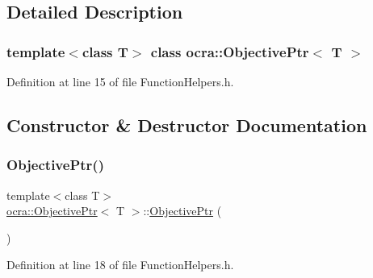 \subsection{Detailed Description}
\subsubsection*{template$<$class T$>$\newline
class ocra\+::\+Objective\+Ptr$<$ T $>$}



Definition at line 15 of file Function\+Helpers.\+h.



\subsection{Constructor \& Destructor Documentation}
\hypertarget{classocra_1_1ObjectivePtr_ac82097858040b94f9beb50e038dd00d6}{}\label{classocra_1_1ObjectivePtr_ac82097858040b94f9beb50e038dd00d6} 
\subsubsection{\texorpdfstring{Objective\+Ptr()}{ObjectivePtr()}\hspace{0.1cm}{\footnotesize\ttfamily [1/2]}}
{\footnotesize\ttfamily template$<$class T$>$ \\
\hyperlink{classocra_1_1ObjectivePtr}{ocra\+::\+Objective\+Ptr}$<$ T $>$\+::\hyperlink{classocra_1_1ObjectivePtr}{Objective\+Ptr} (\begin{DoxyParamCaption}{ }\end{DoxyParamCaption})\hspace{0.3cm}{\ttfamily [inline]}}



Definition at line 18 of file Function\+Helpers.\+h.

\hypertarget{classocra_1_1ObjectivePtr_ad8f830f8027859f3ac4daaf4e3bdc16f}{}\label{classocra_1_1ObjectivePtr_ad8f830f8027859f3ac4daaf4e3bdc16f} 
